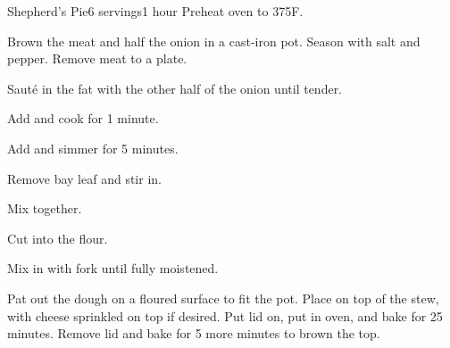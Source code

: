 \documentclass[../Cookbook.tex]{subfiles}
\begin{document}
\begin{recipe}[ShepherdsPie]{Shepherd's Pie}{6 servings}{1 hour}
Preheat oven to 375\0F.

Brown the meat and half the onion in a cast-iron pot.
Season with salt and pepper.
Remove meat to a plate.

Saut\'e in the fat with the other half of the onion until tender.

Add and cook for 1 minute.

Add and simmer for 5 minutes.

Remove bay leaf and stir in.


Mix together.

Cut into the flour.

Mix in with fork until fully moistened.

Pat out the dough on a floured surface to fit the pot.
Place on top of the stew, with cheese sprinkled on top if desired.
Put lid on, put in oven, and bake for 25 minutes.
Remove lid and bake for 5 more minutes to brown the top.

\end{recipe}
\end{document}
